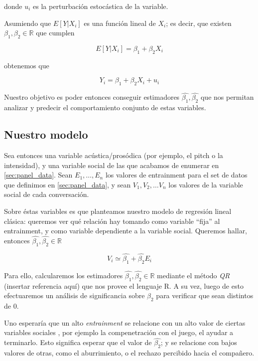 donde $u_i$ es la perturbación estocástica de la variable.

Asumiendo que $E[Y|X_i]$ es una función lineal de $X_i$; es decir, que existen $\beta_1, \beta_2 \in \mathbb{R}$ que cumplen

\begin{equation}
  E[Y|X_i] = \beta_1 + \beta_2 X_i
\end{equation}

obtenemos que

\begin{equation}
  Y_i = \beta_1 + \beta_2 X_i + u_i
\end{equation}

Nuestro objetivo es poder entonces conseguir estimadores $\widehat{\beta_1}, \widehat{\beta_2}$ que nos permitan analizar y predecir el comportamiento conjunto de estas variables.

\subsection{Nuestro modelo}

Sea entonces una variable acústica/prosódica (por ejemplo, el pitch o la intensidad), y una variable social de las que acabamos de enumerar en \ref{sec:panel_data}. Sean $E_1, \ldots, E_n$ los valores de entrainment para el set de datos que definimos en \ref{sec:panel_data}, y sean $V_1, V_2, \ldots V_n$ los valores de la variable social de cada conversación.

Sobre éstas variables es que planteamos nuestro modelo de regresión lineal clásica: queremos ver qué relación hay tomando como variable ``fija'' al entrainment, y como variable dependiente a la variable social. Queremos hallar, entonces $\widehat{\beta_1}, \widehat{\beta_2} \in \mathbb{R}$

\begin{equation}
  V_i \simeq \widehat{\beta_1} + \widehat{\beta_2} E_i
\end{equation}


Para ello, calcularemos los estimadores $\widehat{\beta_1}, \widehat{\beta_2} \in \mathbb{R}$ mediante el método \emph{QR} (insertar referencia aquí) que nos provee el lenguaje R. A su vez, luego de esto efectuaremos un análisis de significancia sobre $\beta_2$ para verificar que sean distintos de 0.


Uno esperaría que un alto \emph{entrainment} se relacione con un alto valor de ciertas variables sociales \cite{BRE1996}, por ejemplo la compenetración con el juego, el ayudar a terminarlo. Esto significa esperar que el valor de $\widehat{\beta_2}$; y se relacione con bajos valores de otras, como el aburrimiento, o el rechazo percibido hacia el compañero.





